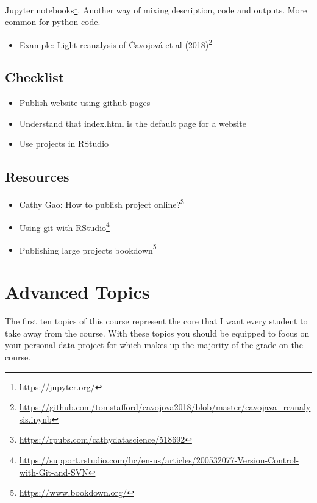 \documentclass[
  12pt,
  a5paper,
]{book}
\DeclareRobustCommand{\href}[2]{#2\footnote{\url{#1}}}
\providecommand{\tightlist}{%
  \setlength{\itemsep}{0pt}\setlength{\parskip}{0pt}}
\begin{document}
\href{https://jupyter.org/}{Jupyter notebooks}. Another way of mixing description, code and outputs. More common for python code.

\begin{itemize}
\tightlist
\item
  Example: \href{https://github.com/tomstafford/cavojova2018/blob/master/cavojava_reanalysis.ipynb}{Light reanalysis of Čavojová et al (2018)}
\end{itemize}

\hypertarget{checklist-8}{%
\section{Checklist}\label{checklist-8}}

\begin{itemize}
\tightlist
\item
  Publish website using github pages
\item
  Understand that index.html is the default page for a website
\item
  Use projects in RStudio
\end{itemize}

\hypertarget{resources-9}{%
\section{Resources}\label{resources-9}}

\begin{itemize}
\tightlist
\item
  Cathy Gao: \href{https://rpubs.com/cathydatascience/518692}{How to publish project online?}
\item
  \href{https://support.rstudio.com/hc/en-us/articles/200532077-Version-Control-with-Git-and-SVN}{Using git with RStudio}
\item
  Publishing large projects \href{https://www.bookdown.org/}{bookdown}
\end{itemize}

\hypertarget{advanced-topics}{%
\chapter*{Advanced Topics}\label{advanced-topics}}


The first ten topics of this course represent the core that I want every student to take away from the course. With these topics you should be equipped to focus on your personal data project for which makes up the majority of the grade on the course.
\end{document}
